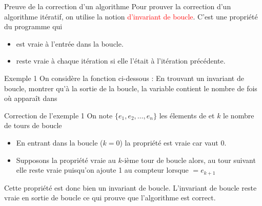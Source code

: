 \documentclass[10pt]{beamer}
\begin{document}
\begin{frame}[fragile]{\Ctitle}{\stitle}
\begin{alertblock}{Preuve de la correction d'un algorithme}
    Pour prouver la correction d'un algorithme itératif, on utilise la notion \textcolor{red}{d'invariant de boucle}. C'est une propriété du programme qui
    \begin{itemize}
        \item<2-> est vraie à l'entrée dans la boucle.
        \item<3-> reste vraie à chaque itération si elle l'était à l'itération précédente.
    \end{itemize}
\end{alertblock}
\end{frame}

\begin{frame}[fragile]{\Ctitle}{\stitle}
\begin{exampleblock}{Exemple 1}
    On considère la fonction ci-dessous :
     En trouvant un invariant de boucle, montrer qu'à la sortie de la boucle, la variable  contient le nombre de fois où  apparaît dans 
\end{exampleblock}
\end{frame}


\begin{frame}[fragile]{\Ctitle}{\stitle}
\begin{exampleblock}{Correction de l'exemple 1}
    \textcolor{OliveGreen}{On note  $\{ e_1, e_2, \dots, e_n \}$ les élements de  et  $k$ le nombre de tours de boucle\\}
    \begin{itemize}
        \item<4-> \textcolor{OliveGreen}{En entrant dans la boucle ($k=0$) la propriété est vraie car  vaut 0.}
        \item<5-> \textcolor{OliveGreen}{Supposons la propriété vraie au $k$-ième tour de boucle alors, au tour suivant elle reste vraie puisqu'on ajoute 1 au compteur lorsque $=e_{k+1}$}
    \end{itemize}
    \textcolor{OliveGreen}{Cette propriété est donc bien un invariant de boucle.}
    \textcolor{OliveGreen}{L'invariant de boucle reste vraie en sortie de boucle ce qui prouve que l'algorithme est correct.}
\end{exampleblock}
\end{frame}
\end{document}
